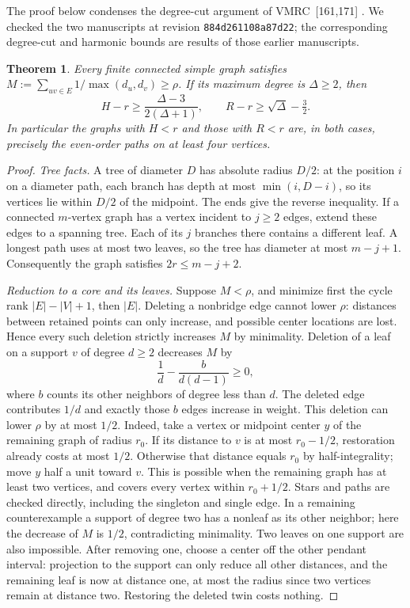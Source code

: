 \documentclass[11pt,a4paper]{article}
\newtheorem{theorem}{Theorem}[section]
\theoremstyle{remark}\newtheorem*{remark}{Remark}
\begin{document}
The proof below condenses the degree-cut argument of VMRC~[161,171]
\cite{cat-rad,cat-harm}. We checked the two manuscripts at revision
\texttt{884d261108a87d22}; the corresponding degree-cut and harmonic
bounds are results of those earlier manuscripts.
\begin{theorem}\label{thm:radius-certified}
Every finite connected simple graph satisfies
$M:=\sum_{uv\in E}1/\max(d_u,d_v)\ge\rho$.
If its maximum degree is $\Delta\ge2$, then
\[
 H-r\ge\frac{\Delta-3}{2(\Delta+1)},\qquad
 R-r\ge\sqrt{\Delta}-\tfrac32.
\]
In particular the graphs with $H<r$ and those with $R<r$ are, in both
cases, precisely the even-order paths on at least four vertices.
\end{theorem}

\begin{proof}
\emph{Tree facts.} A tree of diameter $D$ has absolute radius $D/2$:
at the position $i$ on a diameter path, each branch has depth at most
$\min(i,D-i)$, so its vertices lie within $D/2$ of the midpoint.
The ends give the reverse inequality. If a connected $m$-vertex graph
has a vertex incident to $j\ge2$ edges, extend these edges to a spanning
tree. Each of its $j$ branches there contains a different leaf. A longest
path uses at most two leaves, so the tree has diameter at most $m-j+1$.
Consequently the graph satisfies $2r\le m-j+2$.

\emph{Reduction to a core and its leaves.} Suppose $M<\rho$, and minimize
first the cycle rank $|E|-|V|+1$, then $|E|$. Deleting a nonbridge
edge cannot lower $\rho$: distances between retained points can only
increase, and possible center locations are lost. Hence every such deletion
strictly increases $M$ by minimality. Deletion of a leaf on a support
$v$ of degree $d\ge2$ decreases $M$ by
\[
 \frac1d-\frac{b}{d(d-1)}\ge0,
\]
where $b$ counts its other neighbors of degree less than $d$.
The deleted edge contributes $1/d$ and exactly those $b$ edges
increase in weight. This deletion can lower $\rho$ by at most $1/2$.
Indeed, take a vertex or midpoint center $y$ of the remaining graph of
radius $r_0$. If its distance to $v$ is at most $r_0-1/2$, restoration
already costs at most $1/2$. Otherwise that distance equals $r_0$
by half-integrality; move $y$ half a unit toward $v$. This is possible
when the remaining graph has at least two vertices, and covers every
vertex within $r_0+1/2$. Stars and paths are checked directly, including
the singleton and single edge. In a remaining counterexample a support
of degree two has a nonleaf as its other neighbor; here the decrease
of $M$ is $1/2$, contradicting minimality. Two leaves on one support
are also impossible. After removing one, choose a center off the other
pendant interval: projection to the support can only reduce all other
distances, and the remaining leaf is now at distance one, at most
the radius since two vertices remain at distance two. Restoring the
deleted twin costs nothing.


\end{proof}
\end{document}
